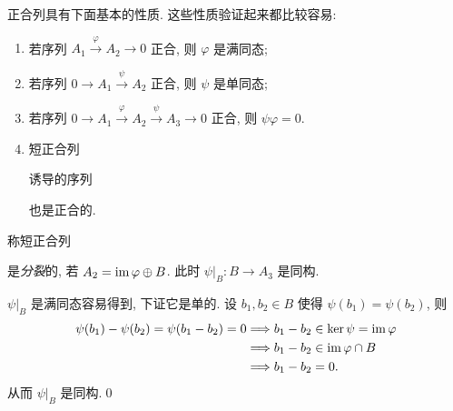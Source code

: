 \begin{Proposition}
	正合列具有下面基本的性质. 这些性质验证起来都比较容易:
	\begin{enumerate}[(1)]
		\item 若序列 $ A_1\stackrel{\varphi}{\to}A_2\to 0 $ 正合, 则 $ \varphi $ 是满同态;
		\item 若序列 $ 0\to A_1\stackrel{\psi}{\to}A_2 $ 正合, 则 $ \psi $ 是单同态;
		\item 若序列 $ 0\to A_1\stackrel{\varphi}{\to}A_2\stackrel{\psi}{\to}A_3\to 0 $ 正合, 则 $ \psi\varphi=0 $.
		\item 短正合列
		\begin{center}
		\end{center}
		诱导的序列
		\begin{center}
		\end{center}
		也是正合的.
	\end{enumerate}
\end{Proposition}

\begin{De-Pr}[分裂的正合列]
	称短正合列
	\begin{center}
	\end{center}
	是\emph{分裂}的, 若 $ A_2=\mathrm{im}\,\varphi\oplus B $. 此时 $ \psi|_B : B\to A_3 $ 是同构.
\end{De-Pr}
\begin{Proof}
	$ \psi|_B $ 是满同态容易得到, 下证它是单的. 设 $ b_1,b_2\in B $ 使得 $ \psi(b_1)=\psi(b_2) $, 则
	\[
		\begin{aligned}
			\psi(b_1)-\psi(b_2)=\psi(b_1-b_2)=0&\Longrightarrow b_1-b_2\in\ker\psi=\mathrm{im}\,\varphi\\
			&\Longrightarrow b_1-b_2\in\mathrm{im}\,\varphi\cap B\\
			&\Longrightarrow b_1-b_2=0.
		\end{aligned}
	\]
	从而 $ \psi|_B $ 是同构.\qed
\end{Proof}

